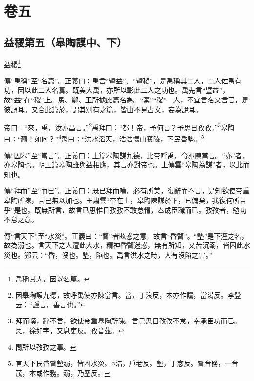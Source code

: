 

\chapter{卷五}


\section{益稷第五（皋陶謨中、下）}


益稷\footnote{禹稱其人，因以名篇。}

{\noindent\zhuan{}\fzbyks 傳“禹稱”至“名篇”。正義曰：禹言“暨益”、“暨稷”，是禹稱其二人，二人佐禹有功，因以此二人名篇。既美大禹，亦所以彰此二人之功也。禹先言“暨益”，故“益”在“稷”上。馬、鄭、王所據此篇名為。“棄”“稷”一人，不宜言名又言官，是彼誤耳。又合此篇於，謂其別有之篇，皆由不見古文，妄為說耳。 \par}

帝曰：“來，禹，汝亦昌言。”\footnote{因皋陶謨九德，故呼禹使亦陳當言。當，丁浪反，本亦作讜，當湯反。李登云：“讜言，善言也。”}禹拜曰：“都！帝，予何言？予思日孜孜。”\footnote{拜而嘆，辭不言，欲使帝重皋陶所陳。言己思日孜孜不怠，奉承臣功而已。思，徐如字，又息吏反。孜音茲。}皋陶曰：“籲！如何？”\footnote{問所以孜孜之事。}禹曰：“洪水滔天，浩浩懷山襄陵，下民昏墊。\footnote{言天下民昏瞀墊溺，皆困水災。○浩，戶老反。墊，丁念反。瞀音務，一音茂，本或作務。溺，乃歷反。}


{\noindent\zhuan{}\fzbyks 傳“因皋”至“當言”。正義曰：上篇皋陶謀九德，此帝呼禹，令亦陳當言。“亦”者，亦皋陶也。明上篇皋陶雖與益相應，其言亦對帝也。上傳雲“皋陶為謀”者，以此而知也。 \par}

{\noindent\zhuan{}\fzbyks 傳“拜而”至“而已”。正義曰：既已拜而嘆，必有所美，復辭而不言，是知欲使帝重皋陶所陳，言己無以加也。王肅雲“帝在上，皋陶陳謀於下，已備矣，我復何所言乎”是也。既無所言，故言已思惟日孜孜不敢怠惰，奉成臣職而已。孜孜者，勉功不怠之意。 \par}

{\noindent\zhuan{}\fzbyks 傳“言天下”至“水災”。正義曰：“瞀”者眩惑之意，故言“昏瞀”。“墊”是下溼之名，故為溺也。言天下之人遭此大水，精神昏瞀迷惑，無有所知，又苦沉溺，皆困此水災也。鄭云：“昏，沒也。墊，陷也。禹言洪水之時，人有沒陷之害。” \par}


